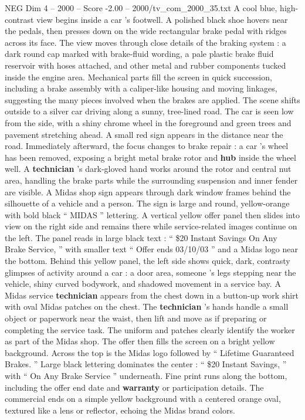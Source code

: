 \begin{textsample}{NEG Dim 4 – 2000 – Score -2.00 – 2000/tv\_com\_2000\_35.txt}  \label{ex:f4_neg_043}
A cool blue, high-contrast view begins inside a car ’s footwell.
A polished black shoe hovers near the pedals, then presses down on the wide rectangular brake pedal with ridges across its face.
The view moves through close details of the braking system : a dark round cap marked with brake-fluid wording, a pale plastic brake fluid reservoir with hoses attached, and other metal and rubber components tucked inside the engine area.
Mechanical parts fill the screen in quick succession, including a brake assembly with a caliper-like housing and moving linkages, suggesting the many pieces involved when the brakes are applied.
The scene shifts outside to a silver car driving along a sunny, tree-lined road.
The car is seen low from the side, with a shiny chrome wheel in the foreground and green trees and pavement stretching ahead.
A small red sign appears in the distance near the road.
Immediately afterward, the focus changes to brake repair : a car ’s wheel has been removed, exposing a bright metal brake rotor and \textbf{hub} inside the wheel well.
A \textbf{technician} ’s dark-gloved hand works around the rotor and central nut area, handling the brake parts while the surrounding suspension and inner fender are visible.
A Midas shop sign appears through dark window frames behind the silhouette of a vehicle and a person.
The sign is large and round, yellow-orange with bold black “ MIDAS ” lettering.
A vertical yellow offer panel then slides into view on the right side and remains there while service-related images continue on the left.
The panel reads in large black text : “ \$20 Instant Savings On Any Brake Service, ” with smaller text “ Offer ends 03/10/03 ” and a Midas logo near the bottom.
Behind this yellow panel, the left side shows quick, dark, contrasty glimpses of activity around a car : a door area, someone ’s legs stepping near the vehicle, shiny curved bodywork, and shadowed movement in a service bay.
A Midas service \textbf{technician} appears from the chest down in a button-up work shirt with oval Midas patches on the chest.
The \textbf{technician} ’s hands handle a small object or paperwork near the waist, then lift and move as if preparing or completing the service task.
The uniform and patches clearly identify the worker as part of the Midas shop.
The offer then fills the screen on a bright yellow background.
Across the top is the Midas logo followed by “ Lifetime Guaranteed Brakes. ” Large black lettering dominates the center : “ \$20 Instant Savings, ” with “ On Any Brake Service ” underneath.
Fine print runs along the bottom, including the offer end date and \textbf{warranty} or participation details.
The commercial ends on a simple yellow background with a centered orange oval, textured like a lens or reflector, echoing the Midas brand colors.

\end{textsample}
